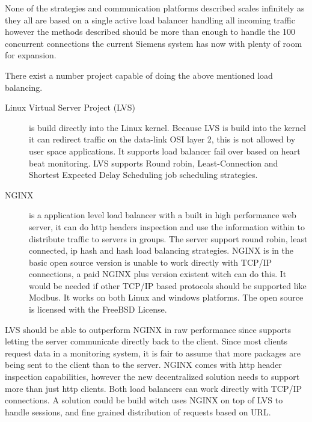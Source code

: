 None of the strategies and communication platforms described scales infinitely as they all are based on a single active load balancer handling all incoming traffic however the methods described should be more than enough to handle the 100 concurrent connections the current Siemens system has now with plenty of room for expansion. 


There exist a number project capable of doing the above mentioned load balancing.


\begin{description}
\item[Linux Virtual Server Project\cite{zhang2000linuxVirtualServer} (LVS)] is build directly into the Linux kernel.
Because LVS is build into the kernel it can redirect traffic on the data-link OSI layer 2, this is not allowed by user space applications.
It supports load balancer fail over based on heart beat monitoring.
LVS supports Round robin, Least-Connection and Shortest Expected Delay Scheduling job scheduling strategies.


\item[NGINX\cite{NGINX_LoadBalancer}] is a application level load balancer with a built in high performance web server, it can do http headers inspection and use the information within to distribute traffic to servers in groups.
The server support round robin, least connected, ip hash and hash load balancing strategies. 
NGINX is in the basic open source version is unable to work directly with TCP/IP connections, a paid NGINX plus version existent witch can do this.
It would be needed if other TCP/IP based protocols should be supported like Modbus.
It works on both Linux and windows platforms.
The open source is licensed with the FreeBSD License.

\end{description}
%
LVS should be able to outperform NGINX in raw performance since supports letting the server communicate directly back to the client.
Since most clients request data in a monitoring system, it is fair to assume that more packages are being sent to the client than to the server.
NGINX comes with http header inspection capabilities, however the new decentralized solution needs to support more than just http clients.
Both load balancers can work directly with TCP/IP connections.
A solution could be build witch uses NGINX on top of LVS to handle sessions, and fine grained distribution of requests based on URL.


